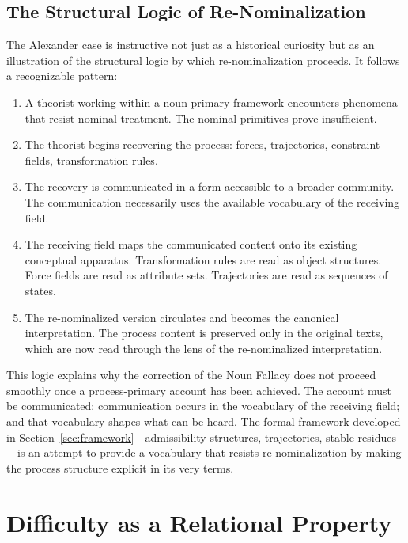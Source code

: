 \documentclass[12pt, a4paper]{article}
\theoremstyle{plain}
\theoremstyle{definition}
\theoremstyle{remark}
\begin{document}
\subsection{The Structural Logic of Re-Nominalization}

The Alexander case is instructive not just as a historical curiosity but as
an illustration of the structural logic by which re-nominalization proceeds.
It follows a recognizable pattern:

\begin{enumerate}[leftmargin=*, label=(\arabic*)]
\item A theorist working within a noun-primary framework encounters phenomena
that resist nominal treatment. The nominal primitives prove insufficient.

\item The theorist begins recovering the process: forces, trajectories,
constraint fields, transformation rules.

\item The recovery is communicated in a form accessible to a broader
community. The communication necessarily uses the available vocabulary
of the receiving field.

\item The receiving field maps the communicated content onto its existing
conceptual apparatus. Transformation rules are read as object structures.
Force fields are read as attribute sets. Trajectories are read as sequences
of states.

\item The re-nominalized version circulates and becomes the canonical
interpretation. The process content is preserved only in the original texts,
which are now read through the lens of the re-nominalized interpretation.
\end{enumerate}

This logic explains why the correction of the Noun Fallacy does not proceed
smoothly once a process-primary account has been achieved. The account must
be communicated; communication occurs in the vocabulary of the receiving
field; and that vocabulary shapes what can be heard. The formal framework
developed in Section~\ref{sec:framework}---admissibility structures,
trajectories, stable residues---is an attempt to provide a vocabulary that
resists re-nominalization by making the process structure explicit in its
very terms.

\section{Difficulty as a Relational Property}
\label{sec:difficulty}
\end{document}
